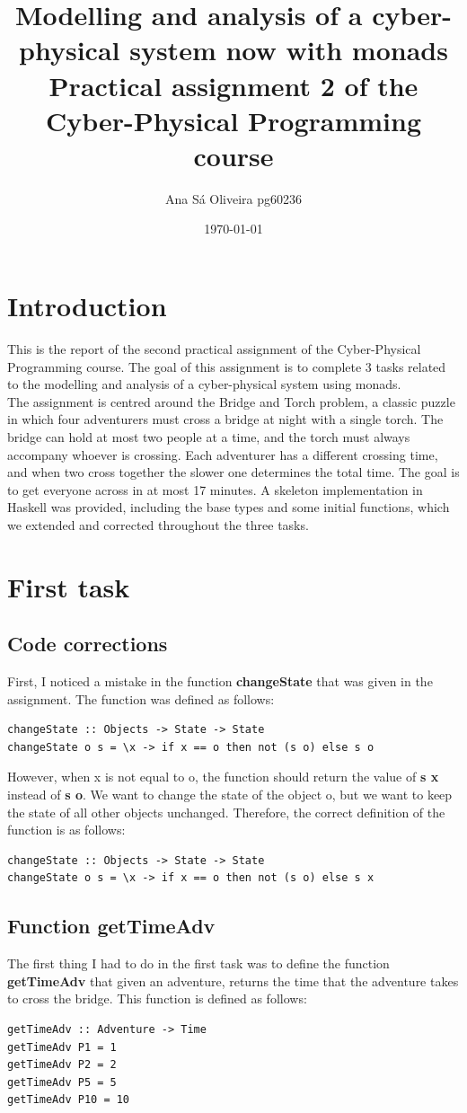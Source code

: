 \documentclass[a4paper,12pt]{report}
\title{\textbf{Modelling and analysis of a cyber-physical system now with monads}
\\[1em] \large Practical assignment 2 of the Cyber-Physical Programming course}
\author{Ana Sá Oliveira pg60236}
\date{\today}
\begin{document}
\maketitle
\tableofcontents
\newpage

\chapter{Introduction}
This is the report of the second practical assignment of the Cyber-Physical Programming course. The goal of this assignment is
to complete 3 tasks related to the modelling and analysis of a cyber-physical system using monads.
\\[1em]
The assignment is centred around the Bridge and Torch problem, a classic puzzle in which
four adventurers must cross a bridge at night with a single torch. The bridge can hold at
most two people at a time, and the torch must always accompany whoever is crossing.
Each adventurer has a different crossing time, and when two cross together the slower one
determines the total time. The goal is to get everyone across in at most 17 minutes.
A skeleton implementation in Haskell was provided, including the base types and some
initial functions, which we extended and corrected throughout the three tasks.
\chapter{First task}
\section{Code corrections}
First, I noticed a mistake in the function \textbf{changeState} that was given in the assignment. The function was defined as follows:
\begin{verbatim}
changeState :: Objects -> State -> State
changeState o s = \x -> if x == o then not (s o) else s o
\end{verbatim}
However, when x is not equal to o, the function should return the value of \textbf{s x} instead of \textbf{s o}.
We want to change the state of the object o, but we want to keep the state of all other objects unchanged.
Therefore, the correct definition of the function is as follows:
\begin{verbatim}
changeState :: Objects -> State -> State
changeState o s = \x -> if x == o then not (s o) else s x
\end{verbatim}

\section{Function getTimeAdv}
The first thing I had to do in the first task was to define the function \textbf{getTimeAdv} that given an adventure, returns the time that the adventure takes to cross the bridge.
This function is defined as follows:
\begin{verbatim}
getTimeAdv :: Adventure -> Time
getTimeAdv P1 = 1
getTimeAdv P2 = 2
getTimeAdv P5 = 5
getTimeAdv P10 = 10
\end{verbatim}
\end{document}
